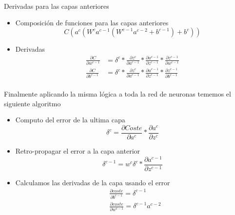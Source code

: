 \par Derivadas para las capas anteriores
\begin{itemize}
    \item Composición de funciones para las capas anteriores
        \begin{equation*}
            C(a^c(W^c a^{c-1}(W^{c-1}a^{c-2} + b^{c-1}) + b^c))
        \end{equation*}
    \item Derivadas
        \begin{align*}
            \frac{\partial C}{\partial w^{c-1}} &= \delta^c* \frac{\partial
            z^c}{\partial a^{c-1}}*\frac{\partial a^{c-1}}{\partial z^{c-1}}*
            \frac{\partial z^{c-1}}{\partial w^{c-1}} \\ 
            \frac{\partial C}{\partial b^{c-1}} &= \delta^c* \frac{\partial
            z^c}{\partial a^{c-1}}*\frac{\partial a^{c-1}}{\partial z^{c-1}} *
            \frac{\partial z^{c-1}}{\partial b^{c-1}} \\
        \end{align*}                                             
\end{itemize}

Finalmente aplicando la misma lógica a toda la red de neuronas tememos el
siguiente algoritmo

\begin{itemize}
    \item Computo del error de la ultima capa
        \begin{equation*}
            \delta ^c = \frac{\partial Coste}{\partial a^c} * \frac{\partial
            a^c}{\partial z^c}
        \end{equation*}
    \item Retro-propagar el error a la capa anterior
        \begin{equation*}
            \delta ^{c-1} = w^c\delta^c * \frac{\partial a^{c-1}}{\partial
            z^{c-1}}
        \end{equation*}
    \item Calculamos las derivadas de la capa usando el error
        \begin{align*}
                    &\frac{\partial coste}{\partial b^{c-1}} = \delta^{c-1} \\
                    &\frac{\partial coste}{\partial w^{c-1}} = \delta^{c-1}
                    a^{c-2}
        \end{align*}
\end{itemize}
